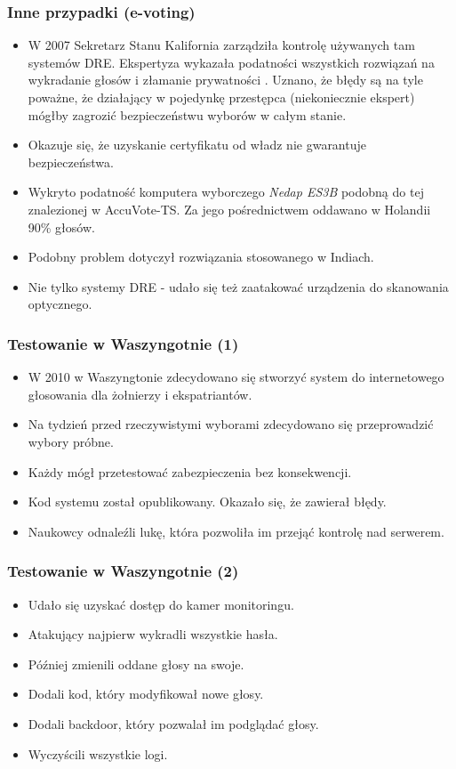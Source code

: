 \documentclass{beamer}
\begin{document}
\begin{frame}
\frametitle{Inne przypadki (e-voting)} \pause
\begin{itemize}
\item W 2007 Sekretarz Stanu Kalifornia zarządziła kontrolę używanych tam systemów DRE. Ekspertyza wykazała podatności wszystkich rozwiązań na wykradanie głosów i złamanie prywatności . Uznano, że błędy są na tyle poważne, że działający w pojedynkę przestępca (niekoniecznie ekspert) mógłby zagrozić bezpieczeństwu wyborów w całym stanie. \pause
\item Okazuje się, że uzyskanie certyfikatu od władz nie gwarantuje bezpieczeństwa. \pause
\item Wykryto podatność komputera wyborczego \textit{Nedap ES3B} podobną do tej znalezionej w AccuVote-TS. Za jego pośrednictwem oddawano w Holandii 90\% głosów. \pause
\item Podobny problem dotyczył rozwiązania stosowanego w Indiach. \pause
\item Nie tylko systemy DRE - udało się też zaatakować urządzenia do skanowania optycznego.
\end{itemize}
\end{frame}

\begin{frame}
\frametitle{Testowanie w Waszyngotnie (1)}
\begin{itemize}
\item W 2010 w Waszyngtonie zdecydowano się stworzyć system do internetowego głosowania dla żołnierzy i ekspatriantów. \pause
\item Na tydzień przed rzeczywistymi wyborami zdecydowano się przeprowadzić wybory próbne. \pause
\item Każdy mógł przetestować zabezpieczenia bez konsekwencji. \pause
\item Kod systemu został opublikowany. Okazało się, że zawierał błędy. \pause
\item Naukowcy odnaleźli lukę, która pozwoliła im przejąć kontrolę nad serwerem.
\end{itemize}
\end{frame}

\begin{frame}
\frametitle{Testowanie w Waszyngotnie (2)}
\begin{itemize}
\item Udało się uzyskać dostęp do kamer monitoringu.\pause
\item Atakujący najpierw wykradli wszystkie hasła.\pause
\item Później zmienili oddane głosy na swoje.\pause
\item Dodali kod, który modyfikował nowe głosy.\pause
\item Dodali backdoor, który pozwalał im podglądać głosy.\pause
\item Wyczyścili wszystkie logi.
\end{itemize}
\end{frame}
\end{document}

